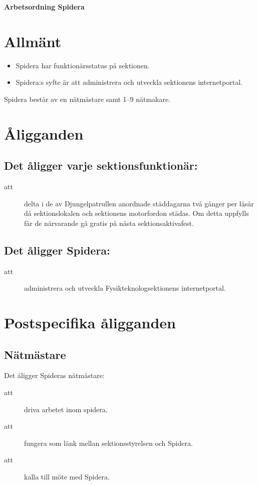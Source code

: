 \renewcommand{\dateseparator}{-} %

\renewcommand{\forening}{Spidera}

\begin{center}
\LARGE{\textbf{Arbetsordning Spidera}}
\end{center}


\section{Allmänt}
\begin{itemize}
\item Spidera har funktionärsstatus på sektionen.

\item Spidera:s syfte är att administrera och utveckla sektionens internetportal.

\end{itemize}

Spidera består av en nätmästare samt 1--9
  nätmakare. 


\section{Åligganden}
\subsection{Det åligger varje sektionsfunktionär:}
    \begin{description}
      \item[att] delta i de av Djungelpatrullen anordnade städdagarna två gånger per
      läsår då sektionslokalen och sektionens motorfordon städas. Om detta uppfylls får de närvarande gå gratis på nästa
      sektionsaktivafest.
    \end{description}
\subsection{Det åligger Spidera:}
    \begin{description}
      \item[att] administrera och utveckla Fysikteknologsektionens internetportal.
    \end{description}
\section{Postspecifika åligganden}
\subsection{Nätmästare}
Det åligger Spideras nätmästare:
\begin{description}
      \item[att] driva arbetet inom spidera.
      \item[att] fungera som länk mellan sektionsstyrelsen och Spidera.
      \item[att] kalla till möte med Spidera.
\end{description}


